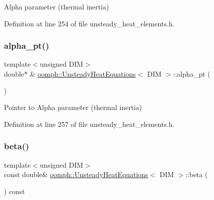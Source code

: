 Alpha parameter (thermal inertia) 



Definition at line 254 of file unsteady\+\_\+heat\+\_\+elements.\+h.

\mbox{\label{classoomph_1_1UnsteadyHeatEquations_ac1607b3b8cf1a1cd52b61f8bbc45a210}} 
\subsubsection{\texorpdfstring{alpha\+\_\+pt()}{alpha\_pt()}}
{\footnotesize\ttfamily template$<$unsigned D\+IM$>$ \\
double$\ast$ \& \hyperlink{classoomph_1_1UnsteadyHeatEquations}{oomph\+::\+Unsteady\+Heat\+Equations}$<$ D\+IM $>$\+::alpha\+\_\+pt (\begin{DoxyParamCaption}{ }\end{DoxyParamCaption})\hspace{0.3cm}{\ttfamily [inline]}}



Pointer to Alpha parameter (thermal inertia) 



Definition at line 257 of file unsteady\+\_\+heat\+\_\+elements.\+h.

\mbox{\label{classoomph_1_1UnsteadyHeatEquations_aca11360903e1f4c7513e1f91e8a1e4b7}} 
\subsubsection{\texorpdfstring{beta()}{beta()}}
{\footnotesize\ttfamily template$<$unsigned D\+IM$>$ \\
const double\& \hyperlink{classoomph_1_1UnsteadyHeatEquations}{oomph\+::\+Unsteady\+Heat\+Equations}$<$ D\+IM $>$\+::beta (\begin{DoxyParamCaption}{ }\end{DoxyParamCaption}) const\hspace{0.3cm}{\ttfamily [inline]}}



